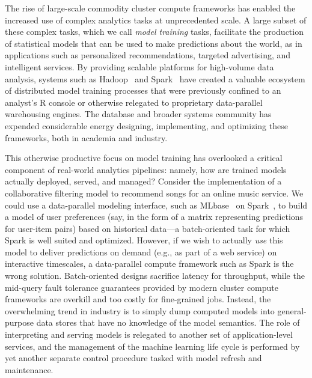 The rise of large-scale commodity cluster compute frameworks has enabled the
increased use of complex analytics tasks at unprecedented scale. A large subset
of these complex tasks, which we call \textit{model training} tasks, facilitate
the production of statistical models that can be used to make predictions about
the world, as in applications such as personalized recommendations,
targeted advertising, and intelligent services. By providing scalable platforms
for high-volume data analysis, systems such as Hadoop~\cite{fnt-mr} and
Spark~\cite{spark} have created a valuable ecosystem of distributed model
training processes that were previously confined to an analyst's R console or
otherwise relegated to proprietary data-parallel warehousing engines. The
database and broader systems community has expended considerable energy
designing, implementing, and optimizing these frameworks, both in academia and
industry.

This otherwise productive focus on model training has overlooked a
critical component of real-world analytics pipelines: namely, how are
trained models actually deployed, served, and managed? Consider the
implementation of a collaborative filtering model to recommend songs
for an online music service.  We could use a data-parallel modeling
interface, such as MLbase~\cite{mlbase} on Spark~\cite{spark}, to
build a model of user preferences (say, in the form of a matrix
representing predictions for user-item pairs) based on historical
data---a batch-oriented task for which Spark is well suited and
optimized.  However, if we wish to actually \textit{use} this model to
deliver predictions on demand (e.g., as part of a web service) on
interactive timescales, a data-parallel compute framework such as
Spark is the wrong solution.  Batch-oriented designs sacrifice latency
for throughput, while the mid-query fault tolerance guarantees
provided by modern cluster compute frameworks are overkill and too
costly for fine-grained jobs. Instead, the overwhelming trend in
industry is to simply dump computed models into general-purpose data
stores that have no knowledge of the model semantics. The role of
interpreting and serving models is relegated to another set of
application-level services, and the management of the machine learning
life cycle is performed by yet another
separate control procedure tasked with model refresh and maintenance.



